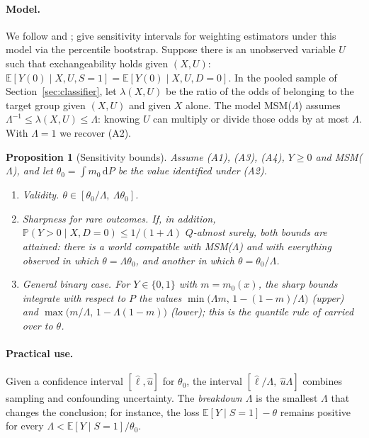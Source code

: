 \documentclass[twoside,11pt]{article}
\newcommand{\E}{\mathbb{E}}
\newcommand{\PP}{\mathbb{P}}
\newcommand{\dd}{\,\mathrm{d}}
\theoremstyle{plain}
\newtheorem{proposition}{Proposition}
\theoremstyle{definition}
\begin{document}
\paragraph{Model.} We follow \citet{tan2006} and \citet{dorn2023}; \citet{zhao2019} give sensitivity intervals for weighting estimators under this model via the percentile bootstrap. Suppose there is an unobserved variable $U$ such that exchangeability holds given $(X,U)$: $\E[Y(0)\mid X,U,S=1]=\E[Y(0)\mid X,U,D=0]$. In the pooled sample of Section~\ref{sec:classifier}, let $\lambda(X,U)$ be the ratio of the odds of belonging to the target group given $(X,U)$ and given $X$ alone. The model MSM($\Lambda$) assumes $\Lambda^{-1}\le\lambda(X,U)\le\Lambda$: knowing $U$ can multiply or divide those odds by at most $\Lambda$. With $\Lambda=1$ we recover (A2).

\begin{proposition}[Sensitivity bounds]\label{prop:sensitivity}
Assume (A1), (A3), (A4), $Y\ge0$ and MSM($\Lambda$), and let $\theta_0=\int m_0\dd P$ be the value identified under (A2).
\begin{enumerate}
  \item \emph{Validity.} $\theta\in[\theta_0/\Lambda,\ \Lambda\theta_0]$.
  \item \emph{Sharpness for rare outcomes.} If, in addition, $\PP(Y>0\mid X,D=0)\le1/(1+\Lambda)$ $Q$-almost surely, both bounds are attained: there is a world compatible with MSM($\Lambda$) and with everything observed in which $\theta=\Lambda\theta_0$, and another in which $\theta=\theta_0/\Lambda$.
  \item \emph{General binary case.} For $Y\in\{0,1\}$ with $m=m_0(x)$, the sharp bounds integrate with respect to $P$ the values $\min\bigl(\Lambda m,\,1-(1-m)/\Lambda\bigr)$ (upper) and $\max\bigl(m/\Lambda,\,1-\Lambda(1-m)\bigr)$ (lower); this is the quantile rule of \citet{dorn2023} carried over to $\theta$.
\end{enumerate}
\end{proposition}

\paragraph{Practical use.} Given a confidence interval $[\hat\ell,\hat u]$ for $\theta_0$, the interval $[\hat\ell/\Lambda,\ \hat u\Lambda]$ combines sampling and confounding uncertainty. The \emph{breakdown $\Lambda$} is the smallest $\Lambda$ that changes the conclusion; for instance, the loss $\E[Y\mid S=1]-\theta$ remains positive for every $\Lambda<\E[Y\mid S=1]/\theta_0$.
\end{document}
